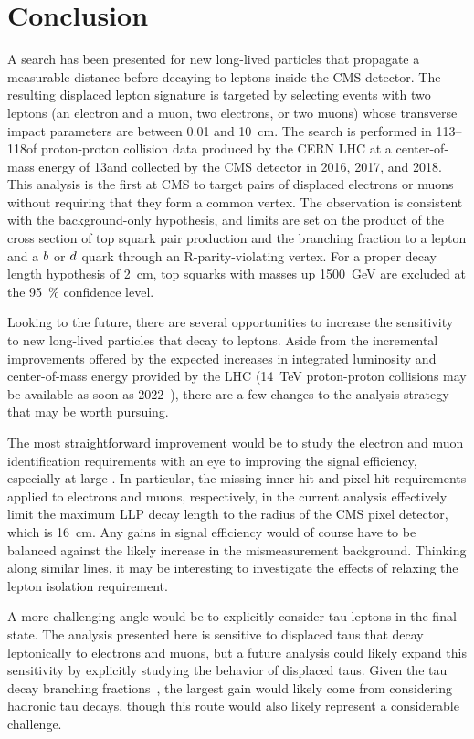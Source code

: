 \chapter{Conclusion}
\label{conclusion}
A search has been presented for new long-lived particles that propagate a measurable distance before decaying to leptons inside the CMS detector. The resulting displaced lepton signature is targeted by selecting events with two leptons (an electron and a muon, two electrons, or two muons) whose transverse impact parameters are between \num{0.01} and \SI{10}{\cm}. The search is performed in 113--118\fbinv of proton-proton collision data produced by the CERN LHC at a center-of-mass energy of 13\TeV and collected by the CMS detector in 2016, 2017, and 2018. This analysis is the first at CMS to target pairs of displaced electrons or muons without requiring that they form a common vertex. The observation is consistent with the background-only hypothesis, and limits are set on the product of the cross section of top squark pair production and the branching fraction to a lepton and a $b$ or $d$ quark through an R-parity-violating vertex. For a proper decay length hypothesis of \SI{2}{\cm}, top squarks with masses up \SI{1500}{\GeV} are excluded at the \SI{95}{\percent} confidence level.

Looking to the future, there are several opportunities to increase the sensitivity to new long-lived particles that decay to leptons. Aside from the incremental improvements offered by the expected increases in integrated luminosity and center-of-mass energy provided by the LHC (\SI{14}{\TeV} proton-proton collisions may be available as soon as 2022~\cite{run3_constraints, lhc_schedule}), there are a few changes to the analysis strategy that may be worth pursuing.

The most straightforward improvement would be to study the electron and muon identification requirements with an eye to improving the signal efficiency, especially at large \ad. In particular, the missing inner hit and pixel hit requirements applied to electrons and muons, respectively, in the current analysis effectively limit the maximum LLP decay length to the radius of the CMS pixel detector, which is \SI{16}{\cm}. Any gains in signal efficiency would of course have to be balanced against the likely increase in the mismeasurement background. Thinking along similar lines, it may be interesting to investigate the effects of relaxing the lepton isolation requirement.

A more challenging angle would be to explicitly consider tau leptons in the final state. The analysis presented here is sensitive to displaced taus that decay leptonically to electrons and muons, but a future analysis could likely expand this sensitivity by explicitly studying the \ad behavior of displaced taus. Given the tau decay branching fractions~\cite{pdg_2020}, the largest gain would likely come from considering hadronic tau decays, though this route would also likely represent a considerable challenge.

